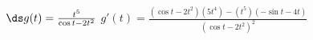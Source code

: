 {$\ds g(t) = \frac{t^5}{\cos t-2t^2}$
}
{$g'(t) = \frac{(\cos t-2t^2)(5t^4)-(t^5)(-\sin t-4t)}{(\cos t-2t^2)^2}$
}
